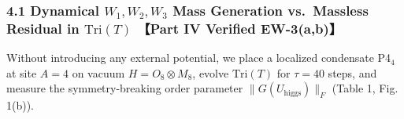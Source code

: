 \documentclass[
  a4paper,
]{article}
\begin{document}
\subsubsection{\texorpdfstring{4.1 Dynamical \(W_1, W_2, W_3\) Mass
Generation vs.~Massless Residual in \(\mathrm{Tri}(T)\) 【Part IV
Verified
EW-3(a,b)】}{4.1 Dynamical W\_1, W\_2, W\_3 Mass Generation vs.~Massless Residual in \textbackslash mathrm\{Tri\}(T) 【Part IV Verified EW-3(a,b)】}}\label{dynamical-w_1-w_2-w_3-mass-generation-vs.-massless-residual-in-mathrmtrit-part-iv-verified-ew-3ab}

Without introducing any external potential, we place a localized
condensate P4\(_4\) at site \(A=4\) on vacuum \(H = O_8\otimes M_8\),
evolve \(\mathrm{Tri}(T)\) for \(\tau=40\) steps, and measure the
symmetry-breaking order parameter \(\|G(U_{\mathrm{higgs}})\|_F\) (Table
1, Fig. 1(b)).
\end{document}
